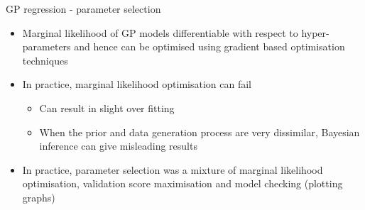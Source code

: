 \begin{frame}{GP regression - parameter selection}
  \begin{itemize}
    \item Marginal likelihood of GP models differentiable with respect to hyper-parameters and hence can be optimised using gradient based optimisation techniques
    \vspace{\baselineskip}
    \item In practice, marginal likelihood optimisation can fail
    \begin{itemize}
      \item Can result in slight over fitting
      \item When the prior and data generation process are very dissimilar, Bayesian inference can give misleading results
    \end{itemize}
    \vspace{\baselineskip}
    \item In practice, parameter selection was a mixture of marginal likelihood optimisation, validation score maximisation and model checking (plotting graphs)
  \end{itemize}
\end{frame}

